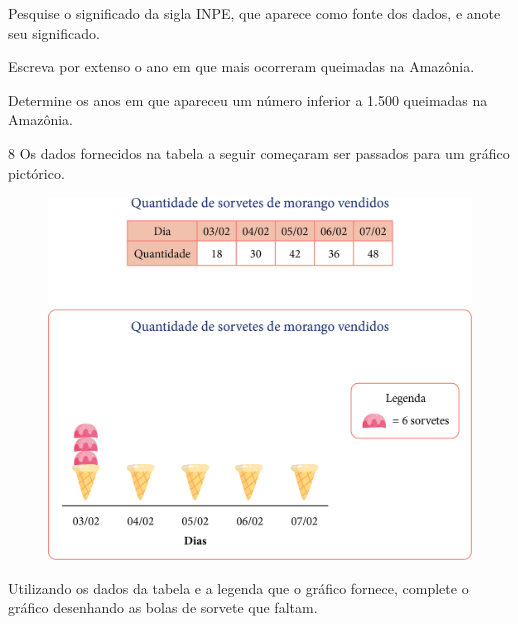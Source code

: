 \begin{escolha}
\item
  Pesquise o significado da sigla INPE, que aparece como fonte dos dados,
  e anote seu significado.


\item
  Escreva por extenso o ano em que mais ocorreram queimadas na Amazônia.


\item
  Determine os anos em que apareceu um número inferior a 1.500 queimadas na
  Amazônia.

\end{escolha}


\pagebreak
\num{8} Os dados fornecidos na tabela a seguir começaram ser passados para um
gráfico pictórico.

\begin{figure}[htpb!]
\centering
\includegraphics[width=\textwidth]{media/image47.png}
\end{figure}

Utilizando os dados da tabela e a legenda que o gráfico fornece,
complete o gráfico desenhando as bolas de sorvete que faltam.


